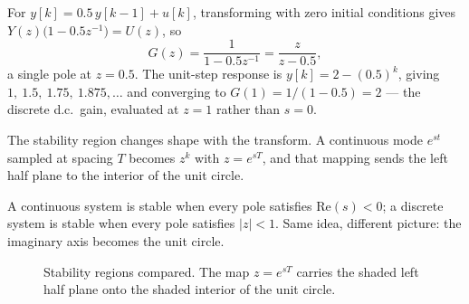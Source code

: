 \documentclass[11pt,a4paper]{article}
\begin{document}
\begin{workedex}[breakable, title=Worked example 3.5 --- a first-order discrete system]
For $y[k] = 0.5\,y[k-1] + u[k]$, transforming with zero initial conditions
gives $Y(z)\bigl(1-0.5z^{-1}\bigr) = U(z)$, so
\[
  G(z) = \frac{1}{1-0.5z^{-1}} = \frac{z}{z-0.5},
\]
a single pole at $z=0.5$. The unit-step response is
$y[k] = 2 - (0.5)^{k}$, giving $1,\ 1.5,\ 1.75,\ 1.875,\dots$ and converging to
$G(1)=1/(1-0.5)=2$ --- the discrete d.c.\ gain, evaluated at $z=1$ rather than
$s=0$.
\end{workedex}

The stability region changes shape with the transform. A continuous mode
$e^{st}$ sampled at spacing $T$ becomes $z^{k}$ with $z=e^{sT}$, and that
mapping sends the left half plane to the interior of the unit circle.

\begin{keyidea}
A continuous system is stable when every pole satisfies $\mathrm{Re}(s)<0$;
a discrete system is stable when every pole satisfies $|z|<1$. Same idea,
different picture: the imaginary axis becomes the unit circle.
\end{keyidea}

\begin{figure}[htbp]
\centering
{}
\caption{Stability regions compared. The map $z=e^{sT}$ carries the shaded left
half plane onto the shaded interior of the unit circle.}
\label{fig:s-vs-z}
\end{figure}
\end{document}
